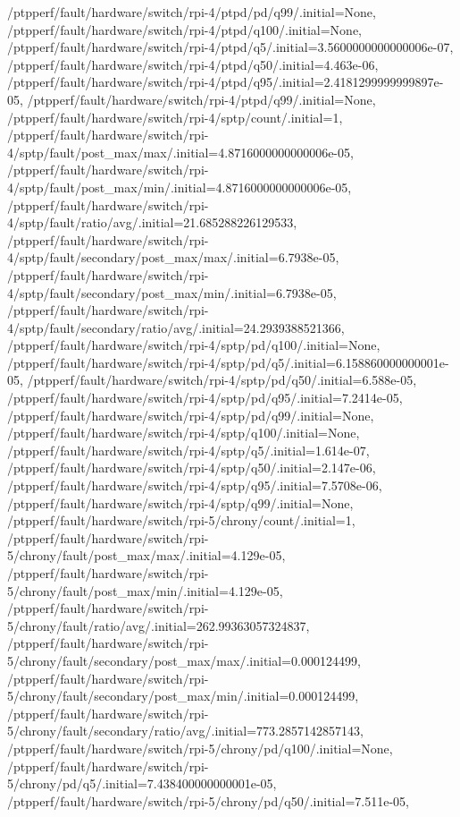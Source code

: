 {    /ptpperf/fault/hardware/switch/rpi-4/ptpd/pd/q99/.initial=None,
    /ptpperf/fault/hardware/switch/rpi-4/ptpd/q100/.initial=None,
    /ptpperf/fault/hardware/switch/rpi-4/ptpd/q5/.initial=3.5600000000000006e-07,
    /ptpperf/fault/hardware/switch/rpi-4/ptpd/q50/.initial=4.463e-06,
    /ptpperf/fault/hardware/switch/rpi-4/ptpd/q95/.initial=2.4181299999999897e-05,
    /ptpperf/fault/hardware/switch/rpi-4/ptpd/q99/.initial=None,
    /ptpperf/fault/hardware/switch/rpi-4/sptp/count/.initial=1,
    /ptpperf/fault/hardware/switch/rpi-4/sptp/fault/post_max/max/.initial=4.8716000000000006e-05,
    /ptpperf/fault/hardware/switch/rpi-4/sptp/fault/post_max/min/.initial=4.8716000000000006e-05,
    /ptpperf/fault/hardware/switch/rpi-4/sptp/fault/ratio/avg/.initial=21.685288226129533,
    /ptpperf/fault/hardware/switch/rpi-4/sptp/fault/secondary/post_max/max/.initial=6.7938e-05,
    /ptpperf/fault/hardware/switch/rpi-4/sptp/fault/secondary/post_max/min/.initial=6.7938e-05,
    /ptpperf/fault/hardware/switch/rpi-4/sptp/fault/secondary/ratio/avg/.initial=24.2939388521366,
    /ptpperf/fault/hardware/switch/rpi-4/sptp/pd/q100/.initial=None,
    /ptpperf/fault/hardware/switch/rpi-4/sptp/pd/q5/.initial=6.158860000000001e-05,
    /ptpperf/fault/hardware/switch/rpi-4/sptp/pd/q50/.initial=6.588e-05,
    /ptpperf/fault/hardware/switch/rpi-4/sptp/pd/q95/.initial=7.2414e-05,
    /ptpperf/fault/hardware/switch/rpi-4/sptp/pd/q99/.initial=None,
    /ptpperf/fault/hardware/switch/rpi-4/sptp/q100/.initial=None,
    /ptpperf/fault/hardware/switch/rpi-4/sptp/q5/.initial=1.614e-07,
    /ptpperf/fault/hardware/switch/rpi-4/sptp/q50/.initial=2.147e-06,
    /ptpperf/fault/hardware/switch/rpi-4/sptp/q95/.initial=7.5708e-06,
    /ptpperf/fault/hardware/switch/rpi-4/sptp/q99/.initial=None,
    /ptpperf/fault/hardware/switch/rpi-5/chrony/count/.initial=1,
    /ptpperf/fault/hardware/switch/rpi-5/chrony/fault/post_max/max/.initial=4.129e-05,
    /ptpperf/fault/hardware/switch/rpi-5/chrony/fault/post_max/min/.initial=4.129e-05,
    /ptpperf/fault/hardware/switch/rpi-5/chrony/fault/ratio/avg/.initial=262.99363057324837,
    /ptpperf/fault/hardware/switch/rpi-5/chrony/fault/secondary/post_max/max/.initial=0.000124499,
    /ptpperf/fault/hardware/switch/rpi-5/chrony/fault/secondary/post_max/min/.initial=0.000124499,
    /ptpperf/fault/hardware/switch/rpi-5/chrony/fault/secondary/ratio/avg/.initial=773.2857142857143,
    /ptpperf/fault/hardware/switch/rpi-5/chrony/pd/q100/.initial=None,
    /ptpperf/fault/hardware/switch/rpi-5/chrony/pd/q5/.initial=7.438400000000001e-05,
    /ptpperf/fault/hardware/switch/rpi-5/chrony/pd/q50/.initial=7.511e-05,
}
